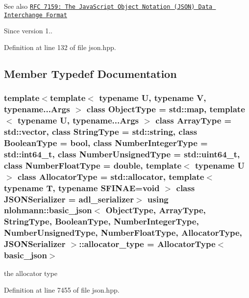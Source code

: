 \begin{DoxySeeAlso}{See also}
\href{http://rfc7159.net/rfc7159}{\tt R\+FC 7159\+: The Java\+Script Object Notation (J\+S\+ON) Data Interchange Format}
\end{DoxySeeAlso}
\begin{DoxySince}{Since}
version 1.. 
\end{DoxySince}


Definition at line 132 of file json.\+hpp.



\subsection{Member Typedef Documentation}
\subsubsection[{\texorpdfstring{allocator\+\_\+type}{allocator_type}}]{\setlength{\rightskip}{0pt plus 5cm}template$<$template$<$ typename U, typename V, typename...\+Args $>$ class Object\+Type = std\+::map, template$<$ typename U, typename...\+Args $>$ class Array\+Type = std\+::vector, class String\+Type  = std\+::string, class Boolean\+Type  = bool, class Number\+Integer\+Type  = std\+::int64\+\_\+t, class Number\+Unsigned\+Type  = std\+::uint64\+\_\+t, class Number\+Float\+Type  = double, template$<$ typename U $>$ class Allocator\+Type = std\+::allocator, template$<$ typename T, typename S\+F\+I\+N\+A\+E=void $>$ class J\+S\+O\+N\+Serializer = adl\+\_\+serializer$>$ using {\bf nlohmann\+::basic\+\_\+json}$<$ Object\+Type, Array\+Type, String\+Type, Boolean\+Type, Number\+Integer\+Type, Number\+Unsigned\+Type, Number\+Float\+Type, Allocator\+Type, J\+S\+O\+N\+Serializer $>$\+::{\bf allocator\+\_\+type} =  Allocator\+Type$<${\bf basic\+\_\+json}$>$}\hypertarget{classnlohmann_1_1basic__json_a86ce930490cf7773b26f5ef49c04a350}{}\label{classnlohmann_1_1basic__json_a86ce930490cf7773b26f5ef49c04a350}


the allocator type 



Definition at line 7455 of file json.\+hpp.

